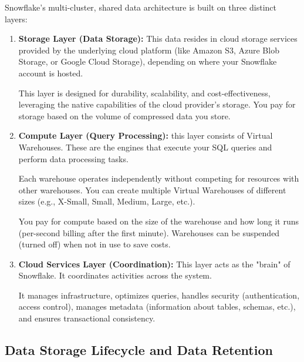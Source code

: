 Snowflake's multi-cluster, shared data architecture is built on three
distinct layers:
\begin{enumerate}
    \item \textbf{Storage Layer (Data Storage):} This data resides in
    cloud storage services provided by the underlying cloud platform
    (like Amazon S3, Azure Blob Storage, or Google Cloud Storage),
    depending on where your Snowflake account is hosted.

    This layer is designed for durability, scalability, and
    cost-effectiveness, leveraging the native capabilities of the
    cloud provider's storage. You pay for storage based on the volume
    of compressed data you store.   

    \item \textbf{Compute Layer (Query Processing):} this layer
    consists of Virtual Warehouses. These are the engines that execute
    your SQL queries and perform data processing tasks.
    
    Each warehouse operates independently without competing for
    resources with other warehouses.
    You can create multiple Virtual Warehouses of different sizes
    (e.g., X-Small, Small, Medium, Large, etc.).

    You pay for compute based on the size of the warehouse and how
    long it runs (per-second billing after the first minute).
    Warehouses can be suspended (turned off) when not in use to save
    costs.

    \item \textbf{Cloud Services Layer (Coordination):} This layer acts
    as the "brain" of Snowflake. It coordinates activities across the
    system.

    It manages infrastructure, optimizes queries, handles security
    (authentication, access control), manages metadata
    (information about tables, schemas, etc.), and ensures transactional
    consistency.
\end{enumerate}



\subsection*{Data Storage Lifecycle and Data Retention}

